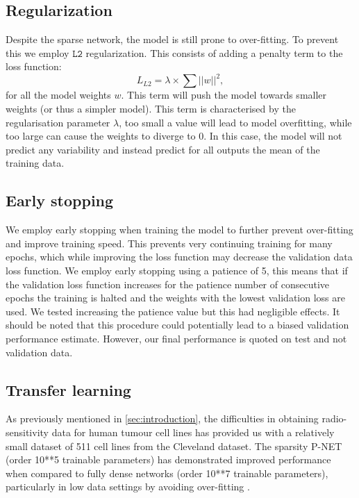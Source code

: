 \documentclass[NOTE, disdraft=true, UKenglish]{\DISCDTLATEXPATH UCLCDTDISdoc}
\begin{document}
\subsection{Regularization}
Despite the sparse network, the model is still prone to over-fitting. To prevent this we employ $\mathtt{L2}$ regularization. This consists of adding a penalty term to the loss function:
\begin{equation}
    L_{L2} = \lambda \times \sum ||w||^2,
\end{equation}
for all the model weights $w$. This term will push the model towards smaller weights (or thus a simpler model). This term is characterised by the regularisation parameter $\lambda$, too small a value will lead to model overfitting, while too large can cause the weights to diverge to 0. In this case, the model will not predict any variability and instead predict for all outputs the mean of the training data.
\subsection{Early stopping}
We employ early stopping \cite{keras-docs} when training the model to further prevent over-fitting and improve training speed. This prevents very continuing training for many epochs, which while improving the loss function may decrease the validation data loss function. We employ early stopping using a patience of 5, this means that if the validation loss function increases for the patience number of consecutive epochs the training is halted and the weights with the lowest validation loss are used. We tested increasing the patience value but this had negligible effects.
It should be noted that this procedure could potentially lead to a biased validation performance estimate. However, our final performance is quoted on test and not validation data.
\subsection{Transfer learning}
As previously mentioned in \ref{sec:introduction}, the difficulties in obtaining radio-sensitivity data for human tumour cell lines has provided us with a relatively small dataset of 511 cell lines from the Cleveland dataset. The sparsity P-NET (order 10**5 trainable parameters) has demonstrated improved performance when compared to fully dense networks (order 10**7 trainable parameters), particularly in low data settings by avoiding over-fitting \cite{elmarakeby_biologically_2021}. 
\end{document}
